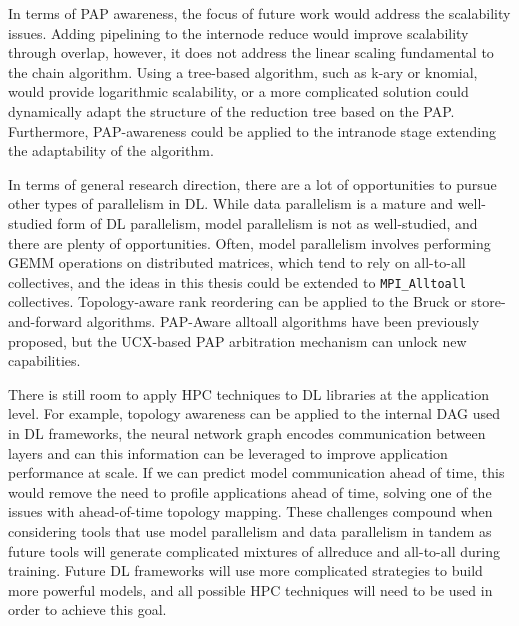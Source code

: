 In terms of \gls{PAP} awareness, the focus of future work would address the scalability issues.
Adding pipelining to the internode reduce would improve scalability through overlap, however, it does not address the linear scaling fundamental to the chain algorithm.
Using a tree-based algorithm, such as k-ary or knomial, would provide logarithmic scalability, or a more complicated solution could dynamically adapt the structure of the reduction tree based on the \gls{PAP}. 
Furthermore, \gls{PAP}-awareness could be applied to the intranode stage extending the adaptability of the algorithm.

In terms of general research direction, there are a lot of opportunities to pursue other types of parallelism in \gls{DL}.
While data parallelism is a mature and well-studied form of \gls{DL} parallelism, model parallelism is not as well-studied, and there are plenty of opportunities.
Often, model parallelism involves performing \gls{GEMM} operations on distributed matrices, which tend to rely on all-to-all collectives, and the ideas in this thesis could be extended to \texttt{MPI\_Alltoall} collectives.
Topology-aware rank reordering can be applied to the Bruck or store-and-forward algorithms.
\gls{PAP}-Aware alltoall algorithms have been previously proposed, but the \gls{UCX}-based PAP arbitration mechanism can unlock new capabilities.

There is still room to apply \gls{HPC} techniques to \gls{DL} libraries at the application level.
For example, topology awareness can be applied to the internal DAG used in \gls{DL} frameworks, the neural network graph encodes communication between layers and can this information can be leveraged to improve application performance at scale.
If we can predict model communication ahead of time, this would remove the need to profile applications ahead of time, solving one of the issues with ahead-of-time topology mapping.
These challenges compound when considering tools that use model parallelism and data parallelism in tandem as future tools will generate complicated mixtures of allreduce and all-to-all during training.
Future \gls{DL} frameworks will use more complicated strategies to build more powerful models, and all possible \gls{HPC} techniques will need to be used in order to achieve this goal.
